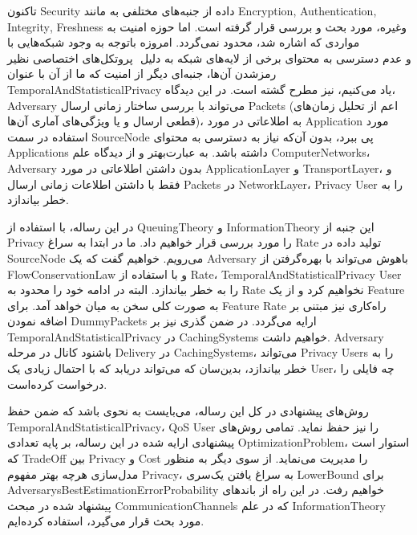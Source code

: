 تاکنون \gls*{Security} داده از جنبه‌های مختلفی به مانند
\gls*{Encryption}, \gls*{Authentication}, \gls*{Integrity}‌, \gls*{Freshness}
و‌غیره، مورد بحث و بررسی قرار گرفته است.  اما  حوزه امنیت به مواردی که اشاره شد، محدود نمی‌گردد. امروزه باتوجه به وجود شبکه‌هایی با پروتکل‌های اختصاصی نظیر ‎‎ و عدم دسترسی به محتوای برخی از لایه‌های شبکه به دلیل رمزشدن آن‌ها، جنبه‌ای دیگر از امنیت که ما از آن با عنوان
\gls*{TemporalAndStatisticalPrivacy}
یاد می‌کنیم، نیز مطرح گشته است. در این دیدگاه،
\gls*{Adversary}
می‌تواند با بررسی ساختار زمانی ارسال \glspl*{Packet} (اعم از  تحلیل زمان‌های ‌قطعی  ارسال و یا ویژگی‌های آماری آن‌ها)، به اطلاعاتی در مورد ‎\gls*{Application}‎ مورد استفاده در سمت \gls*{SourceNode} پی ببرد، بدون آن‌که نیاز به دسترسی به محتوای \glspl*{Application} داشته باشد. به عبارت‌بهتر و از دیدگاه علم
\glspl*{ComputerNetwork}، \gls*{Adversary}
بدون داشتن اطلاعاتی در مورد 
\gls*{ApplicationLayer} و \gls*{TransportLayer}،
و فقط با داشتن اطلاعات زمانی ارسال 
\glspl*{Packet} در \gls*{NetworkLayer}، \gls*{Privacy} \gls*{User}
را به خطر بیاندازد. 

در این رساله، با استفاده از 
‎\gls*{QueuingTheory}‎ و \gls*{InformationTheory}
این جنبه از
\gls*{Privacy}
را مورد بررسی قرار خواهیم داد. ما در ابتدا به سراغ
\gls*{Rate}
تولید داده در \gls*{SourceNode} می‌رویم. خواهیم گفت که یک
\gls*{Adversary}
باهوش می‌تواند با بهره‌گرفتن از
\gls*{FlowConservationLaw} و با استفاده از \gls*{Rate}، \gls*{TemporalAndStatisticalPrivacy} \gls*{User}
را به خطر بیاندازد. البته در ادامه خود را محدود به 
\gls*{Rate}
نخواهیم کرد و از یک
\gls*{Feature}
به صورت کلی سخن به میان خواهد آمد. برای
\gls*{Feature} \gls*{Rate}
راه‌کاری نیز مبتنی بر اضافه نمودن
\glspl*{DummyPacket}
ارایه می‌گردد. در ضمن گذری نیز بر 
\gls*{TemporalAndStatisticalPrivacy} در \glspl*{CachingSystem}
خواهیم داشت.
\gls*{Adversary} 
باشنود کانال در مرحله
\gls*{Delivery} در \glspl*{CachingSystem}،
می‌تواند 
\gls*{Privacy} \glspl*{User}
را به خطر بیاندازد، بدین‌سان که می‌تواند دریابد که با احتمال زیادی یک
\gls*{User}،
چه فایلی را درخواست کرده‌است. 

روش‌های پیشنهادی در کل این رساله، می‌بایست به نحوی باشد که  ضمن حفظ
\gls*{TemporalAndStatisticalPrivacy}، ‎\gls*{QoS}‎ \gls*{User}
را نیز حفظ نماید. تمامی روش‌های پیشنهادی ارایه شده در این رساله، بر پایه تعدادی
\gls*{OptimizationProblem}،
استوار است که 
\gls*{TradeOff} بین \gls*{Privacy} و \gls*{Cost}
را مدیریت می‌نماید. از سوی دیگر به منظور مدل‌سازی هرچه بهتر مفهوم
\gls*{Privacy}، 
به سراغ یافتن یک‌سری
\gls*{LowerBound} برای \gls*{AdversarysBestEstimationErrorProbability}
خواهیم رفت. در این راه از باندهای پیشنهاد شده در مبحث 
\glspl*{CommunicationChannel} که در علم \gls*{InformationTheory}
مورد بحث قرار می‌گیرد، استفاده کرده‌ایم.
